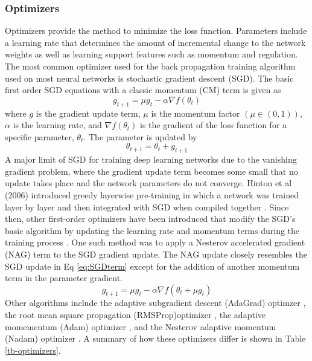 \documentclass[preprint,12pt,authoryear]{elsarticle}
\begin{document}
\begin{linenumbers}
\subsubsection{Optimizers}
Optimizers provide the method to minimize the loss function. Parameters include a learning rate that determines the amount of incremental change to the network weights as well as learning support features such as momentum and regulation. The most common optimizer used for the back propagation training algorithm used on most neural networks is stochastic gradient descent (SGD). The basic first order SGD equations with a classic momentum (CM) term is given as
%
\begin{equation}
\label{eq:SGDterm}
g_{t+1} = \mu g_{t} - \alpha \nabla f (\theta_{t})
\end{equation}
%
where $g$ is the gradient update term, $\mu$ is the momentum factor $(\mu \in (0,1))$, $\alpha$ is the learning rate, and $\nabla f (\theta_{t})$ is the gradient of the loss function for a specific parameter, $\theta_{t}$. The parameter is updated by
%
\begin{equation}
\label{eq:SGDupdate}
\theta_{t+1} = \theta_{t} + g_{t+1}
\end{equation}
%
A major limit of SGD for training deep learning networks due to the vanishing gradient problem, where the gradient update term becomes some small that no update takes place and the network parameters do not converge. Hinton et al (2006) introduced greedy layerwise pre-training in which a network was trained layer by layer and then integrated with SGD when compiled together \citep{Hinton2006}. Since then, other first-order optimizers have been introduced that modify the SGD's basic algorithm by updating the learning rate and momentum terms during the training process \citep{Sutskever2013}.  One such method was to apply a Nesterov accelerated gradient (NAG) \citep{Nesterov1983} term to the SGD gradient update. The NAG update closely resembles the SGD update in Eq \ref{eq:SGDterm} except for the addition of another momentum term in the parameter gradient.
%
\begin{equation}
\label{eq:SGD-NAG}
g_{t+1} = \mu g_{t} - \alpha \nabla f (\theta_{t} + \mu g_{t})
\end{equation}
%
Other algorithms include the adaptive subgradient descent (AdaGrad) optimzer \citep{Duchi2011}, the root mean square propagation (RMSProp)optimizer \citep{Tieleman2012}, the adaptive momementum (Adam) optimizer \citep{Kingma2014}, and the Nesterov adaptive momentum (Nadam) optimizer \citep{Dozat2016}. A summary of how these optimizers differ is shown in Table \ref{tb-optimizers}.
%
\end{linenumbers}
\end{document}
